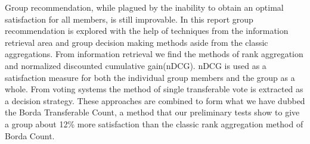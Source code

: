 Group recommendation, while plagued by the inability to obtain an optimal satisfaction for all members, is still improvable. In this report group recommendation is explored with the help of techniques from the information retrieval area and group decision making methods aside from the classic aggregations. From information retrieval we find the methods of rank aggregation and normalized discounted cumulative gain(nDCG). nDCG is used as a satisfaction measure for both the individual group members and the group as a whole. From voting systems the method of single transferable vote is extracted as a decision strategy. These approaches are combined to form what we have dubbed the Borda Transferable Count, a method that our preliminary tests show to give a group about 12\% more satisfaction than the classic rank aggregation method of Borda Count.